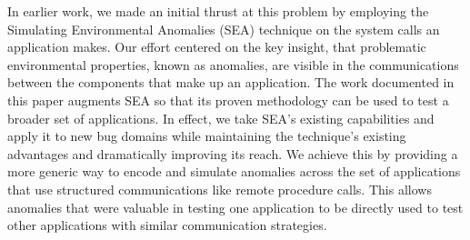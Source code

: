 



In earlier work, we made an initial thrust at this problem by employing the
Simulating Environmental Anomalies (SEA) technique on the system calls an
application makes. Our effort centered on the key insight, that problematic
environmental properties, known as anomalies, are visible in the
communications between the components that make up an application.  The
work documented in this paper augments SEA so that its proven methodology
can be used to test a broader set of applications.
In effect,
we take
SEA's existing capabilities and apply it to new bug
domains while maintaining the technique's existing advantages and
dramatically
improving its reach.
We achieve this by
providing a more generic way to
encode and simulate anomalies across the set of applications that use
structured communications like remote procedure calls.
This allows anomalies that were
valuable in testing one application to be directly used to test other
applications with similar communication strategies.

